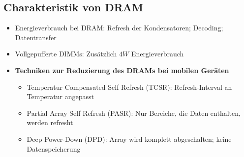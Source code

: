 \subsection{Charakteristik von DRAM}
\begin{itemize}
	\item Energieverbrauch bei DRAM: Refresh der Kondensatoren; Decoding; Datentransfer
	\item Vollgepufferte DIMMs: Zusätzlich \(4W\) Energieverbrauch
	\item \textbf{Techniken zur Reduzierung des DRAMs bei mobilen Geräten}
	\begin{itemize}
		\item Temperatur Compensated Self Refresh (TCSR): Refresh-Interval an Temperatur angepasst
		\item Partial Array Self Refresh (PASR): Nur Bereiche, die Daten enthalten, werden refresht
		\item Deep Power-Down (DPD): Array wird komplett abgeschalten; keine Datenspeicherung
	\end{itemize}
\end{itemize}


